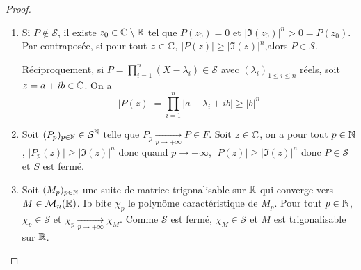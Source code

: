\begin{proof}
	\phantom{}
	\begin{enumerate}
		\item Si $P\notin\mathcal{S}$, il existe $z_{0}\in\mathbb{C}\setminus\mathbb{R}$ tel que $P(z_{0})=0$ et $\vert\Im(z_{0})\vert^{n}>0=P(z_{0})$. Par contraposée, si pour tout $z\in\mathbb{C}$, $\vert P(z)\vert\geqslant\vert\Im(z_{})\vert^{n}$,alors $P\in\mathcal{S}$.

		Réciproquement, si $P=\prod_{i=1}^{n}(X-\lambda_{i})\in\mathcal{S}$ avec $(\lambda_{i})_{1\leqslant i\leqslant n}$ réels, soit $z=a+ib\in\mathbb{C}$. On a
		\begin{equation}\vert P(z)\vert=\prod_{i=1}^{n}\vert a-\lambda_{i}+ib\vert\geqslant\vert b\vert^{n}\end{equation}
		
		\item Soit $(P_{p})_{p\in\mathbb{N}}\in\mathcal{S}^{\mathbb{N}}$ telle que $P_{p}\xrightarrow[p\to+\infty]{}P\in F$. Soit $z\in\mathbb{C}$, on a pour tout $p\in\mathbb{N}$, $\vert P_{p}(z)\vert\geqslant\vert\Im(z)\vert^{n}$ donc quand $p\to+\infty$, $\vert P(z)\vert\geqslant\vert\Im(z)\vert^{n}$ donc $P\in\mathcal{S}$ et $S$ est fermé.
		
		\item Soit $(M_{p})_{p\in\mathbb{N}}$ une suite de matrice trigonalisable sur $\mathbb{R}$ qui converge vers $M\in\mathcal{M}_{n}(\mathbb{R})$. Ib bite $\chi_{p}$ le polynôme caractéristique de $M_{p}$. Pour tout $p\in\mathbb{N}$, $\chi_{p}\in\mathcal{S}$ et $\chi_{p}\xrightarrow[p\to+\infty]{}\chi_{M}$. Comme $\mathcal{S}$ est fermé, $\chi_{M}\in \mathcal{S}$ et $M$ est trigonalisable sur $\mathbb{R}$.
	\end{enumerate}
\end{proof}


